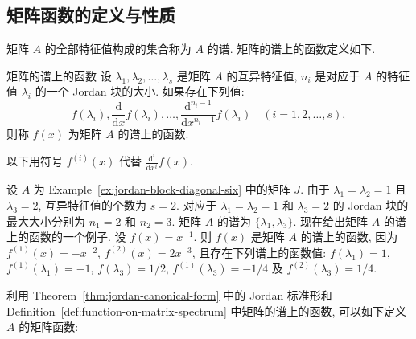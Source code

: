 \subsection{{矩阵函数的定义与性质}}\label{sec:matrix-function-properties}

{矩阵 $A$ 的全部特征值构成的集合称为 $A$ 的谱. 矩阵的谱上的函数定义如下.}

\begin{Definition}{{矩阵的谱上的函数}}\label{def:function-on-matrix-spectrum}
{设 $\lambda_1,\lambda_2,\ldots,\lambda_s$ 是矩阵 $A$ 的互异特征值, $n_i$ 是对应于 $A$ 的特征值 $\lambda_i$ 的一个 Jordan 块的大小. 如果存在下列值:}
\[f(\lambda_i),\frac{\mathrm{d}}{\mathrm{d}x}f(\lambda_i),\ldots,\frac{\mathrm{d}^{n_i-1}}{\mathrm{d}x^{n_i-1}}f(\lambda_i)\quad(i=1,2,\ldots,s),\]
{则称 $f(x)$ 为矩阵 $A$ 的谱上的函数.}
\end{Definition}

{以下用符号 $f^{(i)}(x)$ 代替 $\frac{\mathrm{d}^i}{\mathrm{d}x^i}f(x)$.}

\begin{Example}\label{ex:inverse-on-jordan-spectrum}
{设 $A$ 为 Example~\ref{ex:jordan-block-diagonal-six} 中的矩阵 $J$. 由于 $\lambda_1=\lambda_2=1$ 且 $\lambda_3=2$, 互异特征值的个数为 $s=2$. 对应于 $\lambda_1=\lambda_2=1$ 和 $\lambda_3=2$ 的 Jordan 块的最大大小分别为 $n_1=2$ 和 $n_2=3$. 矩阵 $A$ 的谱为 $\{\lambda_1,\lambda_3\}$. 现在给出矩阵 $A$ 的谱上的函数的一个例子. 设 $f(x)=x^{-1}$. 则 $f(x)$ 是矩阵 $A$ 的谱上的函数, 因为 $f^{(1)}(x)=-x^{-2}$, $f^{(2)}(x)=2x^{-3}$, 且存在下列谱上的函数值: $f(\lambda_1)=1$, $f^{(1)}(\lambda_1)=-1$, $f(\lambda_3)=1/2$, $f^{(1)}(\lambda_3)=-1/4$ 及 $f^{(2)}(\lambda_3)=1/4$.}
\end{Example}

{利用 Theorem~\ref{thm:jordan-canonical-form} 中的 Jordan 标准形和 Definition~\ref{def:function-on-matrix-spectrum} 中矩阵的谱上的函数, 可以如下定义 $A$ 的矩阵函数:}

